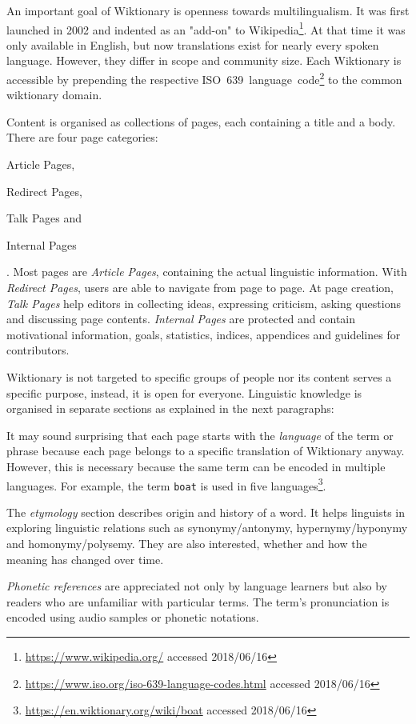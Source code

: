 An important goal of Wiktionary is openness towards multilingualism. It was first launched in 2002 and indented as an "add-on" to Wikipedia\footnote{\url{https://www.wikipedia.org/} accessed 2018/06/16}. At that time it was only available in English, but now translations exist for nearly every spoken language. However, they differ in scope and community size. Each Wiktionary is accessible by prepending the respective ISO~639~language~code\footnote{\url{https://www.iso.org/iso-639-language-codes.html} accessed 2018/06/16} to the common wiktionary domain.

Content is organised as collections of pages, each containing a title and a body. There are four page categories:
\begin{inparaenum}[1)]
		\item Article Pages,
		\item Redirect Pages,
		\item Talk Pages and
		\item Internal Pages
\end{inparaenum}.
Most pages are \emph{Article Pages}, containing the actual linguistic information. With \emph{Redirect Pages}, users are able to navigate from page to page. At page creation, \emph{Talk Pages} help editors in collecting ideas, expressing criticism, asking questions and discussing page contents. \emph{Internal Pages} are protected and contain motivational information, goals, statistics, indices, appendices and guidelines for contributors. 

Wiktionary is not targeted to specific groups of people nor its content serves a specific purpose, instead, it is open for everyone. 
Linguistic knowledge is organised in separate sections as explained in the next paragraphs: 

It may sound surprising that each page starts with the \emph{language} of the term or phrase because each page belongs to a specific translation of Wiktionary anyway. However, this is necessary because the same term can be encoded in multiple languages. For example, the term \texttt{boat} is used in five languages\footnote{\url{https://en.wiktionary.org/wiki/boat} accessed 2018/06/16}. 

The \textit{etymology} section describes origin and history of a word. It helps linguists in exploring linguistic relations such as synonymy/antonymy, hypernymy/hyponymy and homonymy/polysemy. They are also interested, whether and how the meaning has changed over time. 

\textit{Phonetic references} are appreciated not only by language learners but also by readers who are unfamiliar with particular terms. The term's pronunciation is encoded using audio samples or phonetic notations. 

